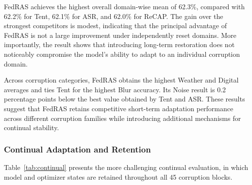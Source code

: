 \documentclass[journal]{IEEEtran}
\begin{document}
FedRAS achieves the highest overall domain-wise mean of 62.3\%, compared with 62.2\% for Tent, 62.1\% for ASR, and 62.0\% for ReCAP. The gain over the strongest competitors is modest, indicating that the principal advantage of FedRAS is not a large improvement under independently reset domains. More importantly, the result shows that introducing long-term restoration does not noticeably compromise the model's ability to adapt to an individual corruption domain.

Across corruption categories, FedRAS obtains the highest Weather and Digital averages and ties Tent for the highest Blur accuracy. Its Noise result is 0.2 percentage points below the best value obtained by Tent and ASR. These results suggest that FedRAS retains competitive short-term adaptation performance across different corruption families while introducing additional mechanisms for continual stability.

\subsubsection{Continual Adaptation and Retention}
Table~\ref{tab:continual} presents the more challenging continual evaluation, in which model and optimizer states are retained throughout all 45 corruption blocks.
\end{document}
